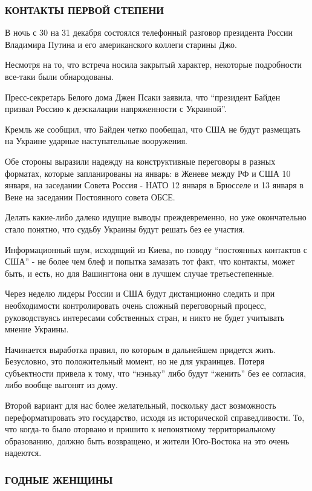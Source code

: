 \subsubsection{КОНТАКТЫ ПЕРВОЙ СТЕПЕНИ}

В ночь с 30 на 31 декабря состоялся телефонный разговор президента России
Владимира Путина и его американского коллеги старины Джо. 

Несмотря на то, что встреча носила закрытый характер, некоторые подробности
все-таки были обнародованы. 

Пресс-секретарь Белого дома Джен Псаки заявила, что \enquote{президент Байден призвал
Россию к деэскалации напряженности с Украиной}. 

Кремль же сообщил, что Байден четко пообещал, что США не будут размещать на
Украине ударные наступательные вооружения.

Обе стороны выразили надежду на конструктивные переговоры в разных форматах,
которые запланированы на январь: в Женеве между РФ и США 10 января, на
заседании Совета Россия - НАТО 12 января в Брюсселе и 13 января в Вене на
заседании Постоянного совета ОБСЕ.

Делать какие-либо далеко идущие выводы преждевременно, но уже окончательно
стало понятно, что судьбу Украины будут решать без ее участия. 

Информационный шум, исходящий из Киева, по поводу \enquote{постоянных контактов с США}
- не более чем блеф и попытка замазать тот факт, что контакты, может быть, и
есть, но для Вашингтона они в лучшем случае третьестепенные.

Через неделю лидеры России и США будут дистанционно следить и при необходимости
контролировать очень сложный переговорный процесс, руководствуясь интересами
собственных стран, и никто не будет учитывать мнение Украины. 

Начинается выработка правил, по которым в дальнейшем придется жить. Безусловно,
это положительный момент, но не для украинцев. Потеря субъектности привела к
тому, что \enquote{нэньку} либо будут \enquote{женить} без ее согласия, либо вообще выгонят из
дому. 

Второй вариант для нас более желательный, поскольку даст возможность
переформатировать это государство, исходя из исторической справедливости. То,
что когда-то было оторвано и пришито к непонятному территориальному
образованию, должно быть возвращено, и жители Юго-Востока на это очень
надеются.

\subsubsection{ГОДНЫЕ ЖЕНЩИНЫ }

